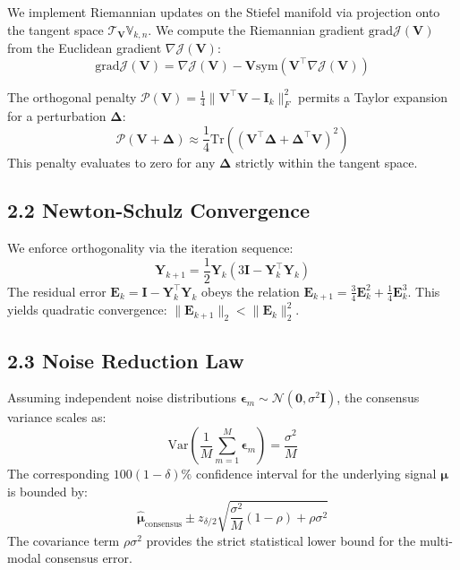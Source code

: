 \documentclass[
  letterpaper,
]{report}
\begin{document}
We implement Riemannian updates on the Stiefel manifold via projection
onto the tangent space \(\mathcal{T}_{\mathbf{V}} \mathbb{V}_{k,n}\). We
compute the Riemannian gradient \(\text{grad} \mathcal{J}(\mathbf{V})\)
from the Euclidean gradient \(\nabla \mathcal{J}(\mathbf{V})\):
\[ \text{grad} \mathcal{J}(\mathbf{V}) = \nabla \mathcal{J}(\mathbf{V}) - \mathbf{V} \text{sym}(\mathbf{V}^\top \nabla \mathcal{J}(\mathbf{V})) \]

The orthogonal penalty
\(\mathcal{P}(\mathbf{V}) = \frac{1}{4} \| \mathbf{V}^\top \mathbf{V} - \mathbf{I}_k \|_F^2\)
permits a Taylor expansion for a perturbation \(\mathbf{\Delta}\):
\[ \mathcal{P}(\mathbf{V} + \mathbf{\Delta}) \approx \frac{1}{4} \text{Tr}\left( (\mathbf{V}^\top \mathbf{\Delta} + \mathbf{\Delta}^\top \mathbf{V})^2 \right) \]
This penalty evaluates to zero for any \(\mathbf{\Delta}\) strictly
within the tangent space.

\subsection{2.2 Newton-Schulz
Convergence}\label{newton-schulz-convergence}

We enforce orthogonality via the iteration sequence:
\[ \mathbf{Y}_{k+1} = \frac{1}{2} \mathbf{Y}_k (3\mathbf{I} - \mathbf{Y}_k^\top \mathbf{Y}_k) \]
The residual error
\(\mathbf{E}_k = \mathbf{I} - \mathbf{Y}_k^\top \mathbf{Y}_k\) obeys the
relation
\(\mathbf{E}_{k+1} = \frac{3}{4} \mathbf{E}_k^2 + \frac{1}{4} \mathbf{E}_k^3\).
This yields quadratic convergence:
\(\| \mathbf{E}_{k+1} \|_2 < \| \mathbf{E}_k \|_2^2\).

\subsection{2.3 Noise Reduction Law}\label{noise-reduction-law}

Assuming independent noise distributions
\(\boldsymbol{\epsilon}_m \sim \mathcal{N}(\mathbf{0}, \sigma^2 \mathbf{I})\),
the consensus variance scales as:
\[ \text{Var}\left( \frac{1}{M} \sum_{m=1}^M \boldsymbol{\epsilon}_m \right) = \frac{\sigma^2}{M} \]
The corresponding \(100(1-\delta)\%\) confidence interval for the
underlying signal \(\boldsymbol{\mu}\) is bounded by:
\[ \hat{\boldsymbol{\mu}}_{\text{consensus}} \pm z_{\delta/2} \sqrt{\frac{\sigma^2}{M}(1-\rho) + \rho\sigma^2} \]
The covariance term \(\rho\sigma^2\) provides the strict statistical
lower bound for the multi-modal consensus error.
\end{document}
